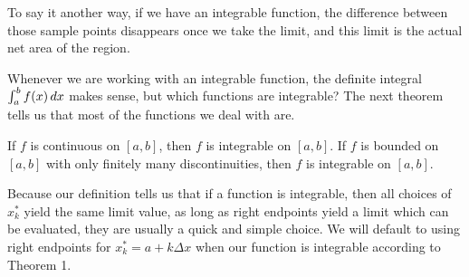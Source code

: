\documentclass{ximera}
\begin{document}
To say it another way, if we have an integrable function, the difference between those sample points disappears once
we take the limit, and this limit is the actual net area of the region.

Whenever we are working with an integrable function, the definite integral $\int_a^b f(x) \mathop{}\!d x$ makes sense, but which functions are integrable?  The next theorem tells us that most of
the functions we deal with are.
\begin{theorem}
If $f$ is continuous on $[a,b]$, then $f$ is integrable on $[a,b]$.  If $f$ is bounded on $[a,b]$ with only finitely many discontinuities, then $f$ is integrable on $[a,b]$.
\end{theorem}

Because our definition tells us that if a function is integrable, then all choices of $x_k^*$ yield the same limit value, as long as right endpoints yield a limit which can be evaluated, they are usually a quick and simple choice. We will default to using right endpoints for $x_k^*=a+k\Delta x$ when our function is integrable according to Theorem 1.
\end{document}

